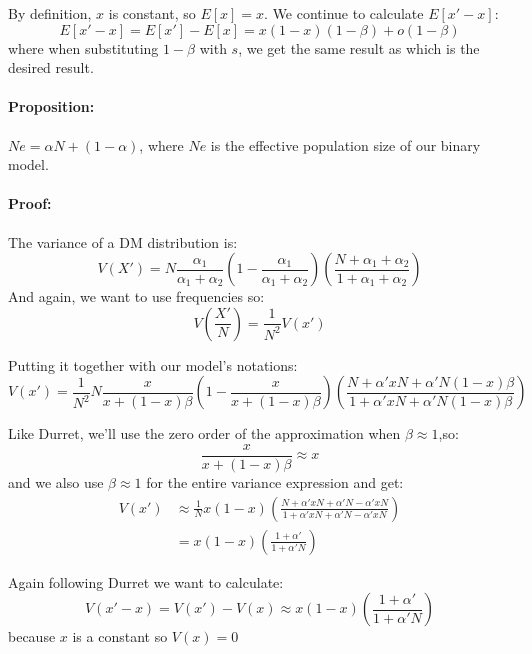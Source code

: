 \documentclass[11pt]{article}
\begin{document}
By definition, $x$ is constant, so $E[x] = x$. We continue to calculate $E[x'-x]$:
\begin{equation}\label{eq:expec_freq}
E[x'-x] = E[x'] - E[x] = x(1-x)(1-\beta) + o(1-\beta)
\end{equation}
where when substituting $1-\beta$ with $s$, we get the same result as \citet{durret} which is the desired result.

\paragraph{Proposition:} $Ne=\alpha N + (1-\alpha)$, where $Ne$ is the effective population size of our binary model.

\paragraph{Proof:} The variance of a DM distribution is:
\begin{equation}
V(X') = N\frac{\alpha_1}{\alpha_1+\alpha_2}(1-\frac{\alpha_1}{\alpha_1+\alpha_2})
(\frac{N + \alpha_1+\alpha_2}{1+\alpha_1+\alpha_2})
\end{equation}
And again, we want to use frequencies so:
\begin{equation}
V(\frac{X'}{N}) = \frac{1}{N^2}V(x')
\end{equation}

Putting it together with our model's notations:
\begin{equation}
V(x') = \frac{1}{N^2}N\frac{x}{x+(1-x)\beta}(1-\frac{x}{x+(1-x)\beta})
(\frac{N + \alpha' xN + \alpha' N(1-x)\beta}{1 + \alpha' xN + \alpha' N(1-x)\beta}) 
\end{equation}

Like Durret, we'll use the zero order of the approximation when $\beta\approx1$,so:
\begin{equation}
\frac{x}{x + (1-x)\beta} \approx x
\end{equation}
and we also use $\beta\approx1$ for the entire variance expression and get:
\begin{equation}
\begin{split}
V(x') & \approx  \frac{1}{N} x(1-x)
(\frac{N + \alpha' xN + \alpha' N - \alpha' xN}{1 + \alpha' xN + \alpha' N - \alpha' xN})\\
&=  x(1-x)(\frac{1 + \alpha'}{1 + \alpha' N}) 
\end{split}
\end{equation}

Again following Durret we want to calculate:
\begin{equation}
V(x'-x) = V(x') - V(x) \approx  x(1-x)(\frac{1 + \alpha'}{1 + \alpha' N})
\end{equation}
because $x$ is a constant so $V(x) = 0$
\end{document}
